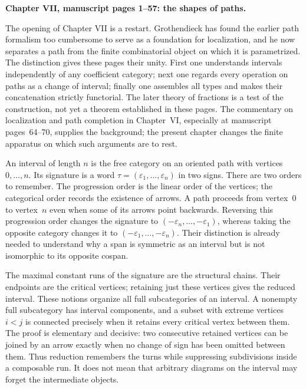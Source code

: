 \noindent\textbf{Chapter VII, manuscript pages 1--57: the shapes of paths.}

The opening of Chapter VII is a restart. Grothendieck has found the earlier path formalism too cumbersome to serve as a foundation for localization, and he now separates a path from the finite combinatorial object on which it is parametrized. The distinction gives these pages their unity. First one understands intervals independently of any coefficient category; next one regards every operation on paths as a change of interval; finally one assembles all types and makes their concatenation strictly functorial. The later theory of fractions is a test of the construction, not yet a theorem established in these pages. The commentary on localization and path completion in Chapter~VI, especially at manuscript pages~64--70, supplies the background; the present chapter changes the finite apparatus on which such arguments are to rest.

An interval of length $n$ is the free category on an oriented path with vertices $0,\ldots,n$. Its signature is a word $\tau=(\varepsilon_1,\ldots,\varepsilon_n)$ in two signs. There are two orders to remember. The progression order is the linear order of the vertices; the categorical order records the existence of arrows. A path proceeds from vertex~$0$ to vertex~$n$ even when some of its arrows point backwards. Reversing this progression order changes the signature to $(-\varepsilon_n,\ldots,-\varepsilon_1)$, whereas taking the opposite category changes it to $(-\varepsilon_1,\ldots,-\varepsilon_n)$. Their distinction is already needed to understand why a span is symmetric as an interval but is not isomorphic to its opposite cospan.

The maximal constant runs of the signature are the structural chains. Their endpoints are the critical vertices; retaining just these vertices gives the reduced interval. These notions organize all full subcategories of an interval. A nonempty full subcategory has interval components, and a subset with extreme vertices $i<j$ is connected precisely when it retains every critical vertex between them. The proof is elementary and decisive: two consecutive retained vertices can be joined by an arrow exactly when no change of sign has been omitted between them. Thus reduction remembers the turns while suppressing subdivisions inside a composable run. It does not mean that arbitrary diagrams on the interval may forget the intermediate objects.

